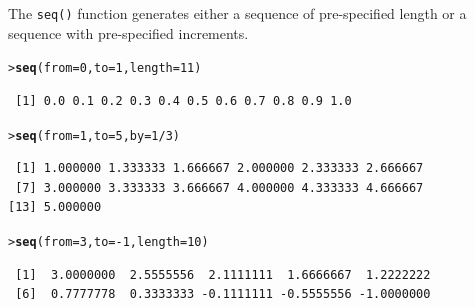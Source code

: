 \documentclass[12pt,oneside]{book}\usepackage[]{graphicx}\usepackage[]{color}
\makeatletter
\newcommand{\hlnum}[1]{\textcolor[rgb]{0.686,0.059,0.569}{#1}}%
\newcommand{\hlopt}[1]{\textcolor[rgb]{0,0,0}{#1}}%
\newcommand{\hlstd}[1]{\textcolor[rgb]{0.345,0.345,0.345}{#1}}%
\newcommand{\hlkwc}[1]{\textcolor[rgb]{0.333,0.667,0.333}{#1}}%
\newcommand{\hlkwd}[1]{\textcolor[rgb]{0.737,0.353,0.396}{\textbf{#1}}}%
\newenvironment{kframe}{%
 \def\at@end@of@kframe{}%
 \ifinner\ifhmode%
  \def\at@end@of@kframe{\end{minipage}}%
  \begin{minipage}{\columnwidth}%
 \fi\fi%
 \def\FrameCommand##1{\hskip\@totalleftmargin \hskip-\fboxsep
 \colorbox{shadecolor}{##1}\hskip-\fboxsep
     \hskip-\linewidth \hskip-\@totalleftmargin \hskip\columnwidth}%
 \MakeFramed {\advance\hsize-\width
   \@totalleftmargin\z@ \linewidth\hsize
   \@setminipage}}%
 {\par\unskip\endMakeFramed%
 \at@end@of@kframe}
\newenvironment{knitrout}{}{} %
\makeatother
\begin{document}
The \verb+seq()+ function generates either a sequence of pre-specified length or a sequence with pre-specified increments.
\begin{knitrout}
\color{fgcolor}\begin{kframe}
\begin{alltt}
\hlstd{> }\hlkwd{seq}\hlstd{(}\hlkwc{from} \hlstd{=} \hlnum{0}\hlstd{,} \hlkwc{to} \hlstd{=} \hlnum{1}\hlstd{,} \hlkwc{length} \hlstd{=} \hlnum{11}\hlstd{)}
\end{alltt}
\begin{verbatim}
 [1] 0.0 0.1 0.2 0.3 0.4 0.5 0.6 0.7 0.8 0.9 1.0
\end{verbatim}
\begin{alltt}
\hlstd{> }\hlkwd{seq}\hlstd{(}\hlkwc{from} \hlstd{=} \hlnum{1}\hlstd{,} \hlkwc{to} \hlstd{=} \hlnum{5}\hlstd{,} \hlkwc{by} \hlstd{=} \hlnum{1}\hlopt{/}\hlnum{3}\hlstd{)}
\end{alltt}
\begin{verbatim}
 [1] 1.000000 1.333333 1.666667 2.000000 2.333333 2.666667
 [7] 3.000000 3.333333 3.666667 4.000000 4.333333 4.666667
[13] 5.000000
\end{verbatim}
\begin{alltt}
\hlstd{> }\hlkwd{seq}\hlstd{(}\hlkwc{from} \hlstd{=} \hlnum{3}\hlstd{,} \hlkwc{to} \hlstd{=} \hlopt{-}\hlnum{1}\hlstd{,} \hlkwc{length} \hlstd{=} \hlnum{10}\hlstd{)}
\end{alltt}
\begin{verbatim}
 [1]  3.0000000  2.5555556  2.1111111  1.6666667  1.2222222
 [6]  0.7777778  0.3333333 -0.1111111 -0.5555556 -1.0000000
\end{verbatim}
\end{kframe}
\end{knitrout}
\end{document}
